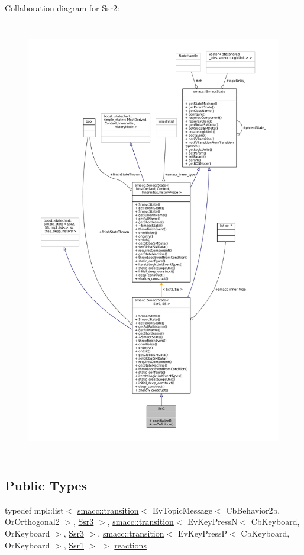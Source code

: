 Collaboration diagram for Ssr2\+:
\nopagebreak
\begin{figure}[H]
\begin{center}
\leavevmode
\includegraphics[height=550pt]{structSsr2__coll__graph}
\end{center}
\end{figure}
\subsection*{Public Types}
\begin{DoxyCompactItemize}
\item 
typedef mpl\+::list$<$ \hyperlink{classsmacc_1_1transition}{smacc\+::transition}$<$ Ev\+Topic\+Message$<$ Cb\+Behavior2b, Or\+Orthogonal2 $>$, \hyperlink{structSsr3}{Ssr3} $>$, \hyperlink{classsmacc_1_1transition}{smacc\+::transition}$<$ Ev\+Key\+PressN$<$ Cb\+Keyboard, Or\+Keyboard $>$, \hyperlink{structSsr3}{Ssr3} $>$, \hyperlink{classsmacc_1_1transition}{smacc\+::transition}$<$ Ev\+Key\+PressP$<$ Cb\+Keyboard, Or\+Keyboard $>$, \hyperlink{structSsr1}{Ssr1} $>$ $>$ \hyperlink{structSsr2_a5ac97d7f41665b2ec688cb4d3728d82d}{reactions}
\end{DoxyCompactItemize}
